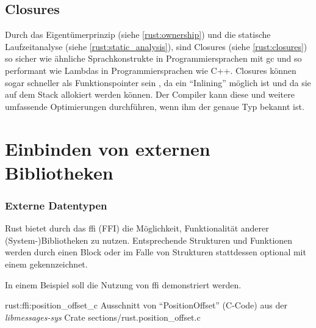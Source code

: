 \subsection{Closures}
\label{rust:zero_cost:closures}

Durch das Eigentümerprinzip (siehe \autoref{rust:ownership}) und die statische Laufzeitanalyse (siehe \autoref{rust:static_analysis}), sind Closures (siehe \autoref{rust:closures}) so sicher wie ähnliche Sprachkonstrukte in Programmiersprachen mit \gls{gc} und so performant wie Lambdas in Programmiersprachen wie C++.
Closures können sogar schneller als Funktionspointer sein \cite [310]{rust:orly_programming}, da ein \enquote{Inlining} möglich ist und da sie auf dem Stack allokiert werden können.
Der Compiler kann diese und weitere umfassende Optimierungen durchführen, wenn ihm der genaue Typ bekannt ist.



\section{Einbinden von externen Bibliotheken}

\subsubsection{Externe Datentypen}
\label{rust:ffi}
\label{rust:ffi:datatypes}

Rust bietet durch das \gls{ffi} (FFI) die Möglichkeit, Funktionalität anderer (System-)Bibliotheken zu nutzen.
Entsprechende Strukturen und Funktionen werden durch einen  Block
oder im Falle von Strukturen stattdessen optional mit einem \rustcinline{#[repr(C)]} gekennzeichnet.

In einem Beispiel soll die Nutzung von \gls{ffi} demonstriert werden.

\ccinclude
	{rust:ffi:position_offset_c}
	{Ausschnitt von \enquote{PositionOffset} (C-Code) aus der \textit{libmessages-sys} Crate}
	{sections/rust.position_offset.c}
	

